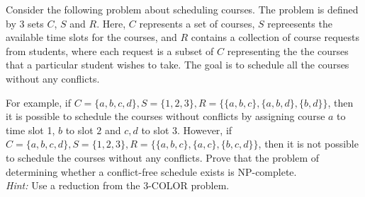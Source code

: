 \problem{}
Consider the following problem about scheduling courses.  The problem is defined by 3 sets $C$, $S$ and $R$.  Here, $C$ represents a set of  courses, $S$ repreesents the available time slots for the courses, and $R$ contains a collection of course requests from students, where each request is a subset of $C$ representing the the courses that a particular student wishes to take.  The goal is to schedule all the courses without any conflicts.  

For example, if $C = \{a, b, c, d\}, S = \{1, 2, 3\}, R = \{\{a, b, c\}, \{a, b, d\}, \{b, d\}\}$, then it is possible to schedule the courses without conflicts by assigning course $a$ to time slot 1, $b$ to slot $2$ and $c, d$ to slot 3.  However, if $C = \{a, b, c, d\}, S = \{1, 2, 3\}, R = \{\{a, b, c\}, \{a, c\}, \{b, c, d\}\}$, then it is not possible to schedule the courses without any conflicts.  Prove that the problem of determining whether a conflict-free schedule exists is NP-complete. \\

\noindent  \emph{Hint:}  Use a reduction from the 3-COLOR problem.

\solution{
}

\newpage